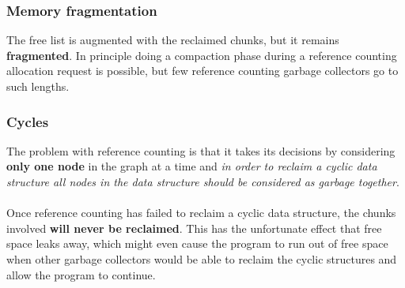 \documentclass[presentation]{beamer}
\begin{document}
\begin{frame}
  \frametitle{Memory fragmentation} 
  \justifying
The free list is augmented with the reclaimed chunks, but it remains \textbf{fragmented}. In principle
doing a compaction phase during a reference counting allocation request is possible,
but few reference counting garbage collectors go to such lengths.

    \begin{figure}
        \centering
        \label{fig:compaction_example}
    \end{figure}

\end{frame}

\begin{frame}
  \frametitle{Cycles} 
  \justifying
The problem with reference counting is that it takes its decisions by considering
\textbf{only one node} in the graph at a time and \textsl{in order to reclaim a cyclic data structure all
nodes in the data structure should be considered as garbage together}. 
\\~\\
\justifying
Once reference counting has failed to reclaim a cyclic data structure, the chunks involved \textbf{will never
be reclaimed}. This has the unfortunate effect that free space leaks away, which might
even cause the program to run out of free space when other garbage collectors would
be able to reclaim the cyclic structures and allow the program to continue.
\\~\\

\end{frame}
\end{document}
